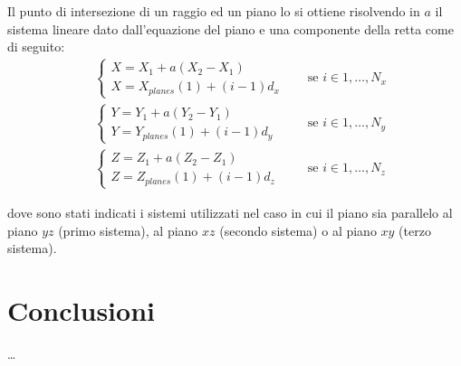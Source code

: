 \documentclass[12pt,a4paper]{report}
\begin{document}
Il punto di intersezione di un raggio ed un piano lo si ottiene risolvendo in \(a\) il sistema lineare dato dall'equazione del
piano e una componente della retta come di seguito:
\begin{equation}
  \begin{aligned}
    &\begin{cases}
      X = X_1 + a (X_2 - X_1) \\
      X = X_{planes}(1) + (i - 1) d_x
    \end{cases} \quad &\text{se } i \in 1, \dots, N_x \\
    &\begin{cases}
      Y = Y_1 + a (Y_2 - Y_1) \\
      Y = Y_{planes}(1) + (i - 1) d_y
    \end{cases} \quad &\text{se } i \in 1, \dots, N_y \\
    &\begin{cases}
      Z = Z_1 + a (Z_2 - Z_1) \\
      Z = Z_{planes}(1) + (i - 1) d_z
    \end{cases} \quad &\text{se } i \in 1, \dots, N_z
  \end{aligned} \nonumber
\end{equation}

dove sono stati indicati i sistemi utilizzati nel caso in cui il piano sia parallelo al piano \(yz\) (primo sistema), al piano
\(xz\) (secondo sistema) o al piano \(xy\) (terzo sistema).

\appendix

\chapter{Conclusioni}

\dots

\printbibliography
\thispagestyle{empty}
\end{document}
